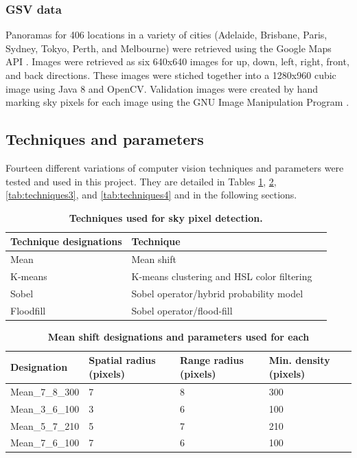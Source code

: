 \documentclass[final,3p,times,authoryear]{elsarticle}
\begin{document}
\subsubsection{GSV data}\label{sec:gsvdata}
Panoramas for 406 locations in a variety of cities (Adelaide, Brisbane, Paris, Sydney, Tokyo, Perth, and Melbourne) were retrieved using the Google Maps API \citep{GoogleMaps2017b}. Images were retrieved as six 640x640 images for up, down, left, right, front, and back directions. These images were stiched together into a 1280x960 cubic image using Java 8 \citep{Oracle2018} and OpenCV\citep {Bradski2000}. Validation images were created by hand marking sky pixels for each image using the GNU Image Manipulation Program \citep{GIMP2019}.

\subsection{Techniques and parameters}
Fourteen different variations of computer vision techniques and parameters were tested and used in this project. They are detailed in Tables \ref{tab:techniques}, \ref{tab:techniques2}, \ref{tab:techniques3}, and \ref{tab:techniques4} and in the following sections.

\begin{table}[!htbp]
\caption{\bf Techniques used for sky pixel detection.  \label{tab:techniques}}     
\begin{tabular}{ l  l l}
\textbf{Technique designations} & \textbf{Technique}  \\ \hline
Mean &  Mean shift \\
K-means  & K-means clustering and HSL color filtering \\
Sobel  & Sobel operator/hybrid probability model \\	
Floodfill  & Sobel operator/flood-fill \\
\hline
\end{tabular}
\end{table}


\begin{table}[!htbp]
\caption{\bf Mean shift designations and parameters used for each \label{tab:techniques2}}     
\begin{tabular}{ l  l  l l}
\textbf{Designation}  & \textbf{Spatial radius (pixels)}&\textbf{Range radius (pixels)}&\textbf{Min. density (pixels)}   \\ \hline
Mean\_7\_8\_300 & 7 & 8& 300 \\
Mean\_3\_6\_100	 & 3& 6& 100 \\
Mean\_5\_7\_210	 & 5& 7& 210 \\	 
Mean\_7\_6\_100	 & 7& 6& 100 \\

\hline
\end{tabular}
\end{table}
\end{document}
